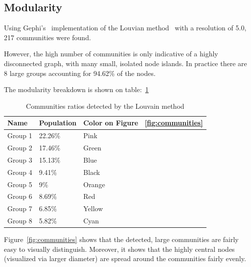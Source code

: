 \subsection{Modularity}\label{subsec:modularity}
Using Gephi's~\cite{Gephi} implementation of the Louvian method~\cite{Louvian} with a resolution of 5.0,
217 communities were found.

However, the high number of communities is only indicative of a highly disconnected graph, with many small, isolated node islands.
In practice there are 8 large groups accounting for 94.62\% of the nodes.

The modularity breakdown is shown on table:~\ref{tab:luv-communities}


\begin{table}[]
\centering
\begin{tabular}{|l|l|l|}
\hline
\textbf{Name} & \textbf{Population} & \textbf{Color on Figure ~\ref{fig:communities}} \\ \hline
Group 1       & 22.26\%             & Pink                     \\ \hline
Group 2       & 17.46\%             & Green                    \\ \hline
Group 3       & 15.13\%             & Blue                     \\ \hline
Group 4       & 9.41\%              & Black                    \\ \hline
Group 5       & 9\%                 & Orange                   \\ \hline
Group 6       & 8.69\%              & Red                      \\ \hline
Group 7       & 6.85\%                & Yellow                   \\ \hline
Group 8       & 5.82\%                & Cyan                     \\ \hline
\end{tabular}
\caption{Communities ratios detected by the Louvain method}
\label{tab:luv-communities}
\end{table}

Figure~\ref{fig:communities} shows that the detected, large communities are fairly easy to visually distinguish.
Moreover, it shows that the highly central nodes (visualized via larger diameter) are spread around the communities fairly evenly.


